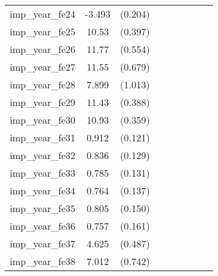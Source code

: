 {\begin{tabular}{l*{4}{cc}}
imp\_year\_fe24&   -3.493\sym{***}&  (0.204)&                  &         &                  &         &                  &         \\
imp\_year\_fe25&    10.53\sym{***}&  (0.397)&                  &         &                  &         &                  &         \\
imp\_year\_fe26&    11.77\sym{***}&  (0.554)&                  &         &                  &         &                  &         \\
imp\_year\_fe27&    11.55\sym{***}&  (0.679)&                  &         &                  &         &                  &         \\
imp\_year\_fe28&    7.899\sym{***}&  (1.013)&                  &         &                  &         &                  &         \\
imp\_year\_fe29&    11.43\sym{***}&  (0.388)&                  &         &                  &         &                  &         \\
imp\_year\_fe30&    10.93\sym{***}&  (0.359)&                  &         &                  &         &                  &         \\
imp\_year\_fe31&    0.912\sym{***}&  (0.121)&                  &         &                  &         &                  &         \\
imp\_year\_fe32&    0.836\sym{***}&  (0.129)&                  &         &                  &         &                  &         \\
imp\_year\_fe33&    0.785\sym{***}&  (0.131)&                  &         &                  &         &                  &         \\
imp\_year\_fe34&    0.764\sym{***}&  (0.137)&                  &         &                  &         &                  &         \\
imp\_year\_fe35&    0.805\sym{***}&  (0.150)&                  &         &                  &         &                  &         \\
imp\_year\_fe36&    0.757\sym{***}&  (0.161)&                  &         &                  &         &                  &         \\
imp\_year\_fe37&    4.625\sym{***}&  (0.487)&                  &         &                  &         &                  &         \\
imp\_year\_fe38&    7.012\sym{***}&  (0.742)&                  &         &                  &         &                  &         \\

\end{tabular}}
